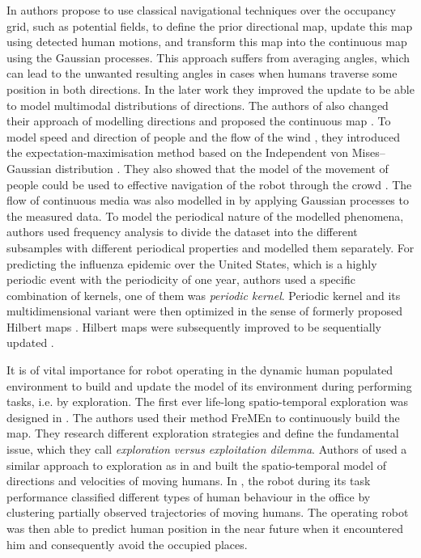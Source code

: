 In \cite{O'Callaghan2011Learning} authors propose to use classical navigational techniques over the occupancy grid, such as potential fields, to define the prior directional map, update this map using detected human motions, and transform this map into the continuous map using the Gaussian processes.
This approach suffers from averaging angles, which can lead to the unwanted resulting angles in cases when humans traverse some position in both directions.
In the later work \cite{McCalman2013MultiModal} they improved the update to be able to model multimodal distributions of directions. 
The authors of \cite{kucner2013conditional} also changed their approach of modelling directions and proposed the continuous map \cite{Kucner2016Tell}.  
To model speed and direction of people and the flow of the wind  \cite{kucner2017enabling}, they introduced the expectation-maximisation method based on the Independent von Mises–Gaussian distribution \cite{roy2012mixture}.
They also showed that the model of the movement of people could be used to effective navigation of the robot through the crowd \cite{palmieri2017kinodynamic}.
The flow of continuous media was also modelled in \cite{Guizilini2015Nonparametric} by applying Gaussian processes \cite{rasmussen2004gaussian} to the measured data.
To model the periodical nature of the modelled phenomena, authors used frequency analysis to divide the dataset into the different subsamples with different periodical properties and modelled them separately.
For predicting the influenza epidemic over the United States, which is a highly periodic event with the periodicity of one year, authors \cite{Senanayake2016Predicting} used a specific combination of kernels, one of them was \textit{periodic kernel}.
Periodic kernel \cite{Tompkins2018Fourier} and its multidimensional variant \cite{Tompkins2018Index} were then optimized in the sense of formerly proposed Hilbert maps \cite{ramos2016hilbert}.
Hilbert maps were subsequently improved to be sequentially updated \cite{Senanayake2017Bayesian}.

It is of vital importance for robot operating in the dynamic human populated environment to build and update the model of its environment during performing tasks, i.e. by exploration.
The first ever life-long spatio-temporal exploration was designed in \cite{Krajnik2015Lifelong}.
The authors used their method FreMEn \cite{krajnik2017fremen} to continuously build the map.
They research different exploration strategies and define the fundamental issue, which they call \textit{exploration versus exploitation dilemma}.
Authors of \cite{Molina2019Go} used a similar approach to exploration as in \cite{Krajnik2015Lifelong} and built the spatio-temporal model of directions and velocities of moving humans.
In \cite{Duckworth2016Unsupervised}, the robot during its task performance classified different types of human behaviour in the office by clustering partially observed trajectories of moving humans.
The operating robot was then able to predict human position in the near future when it encountered him and consequently avoid the occupied places. 



